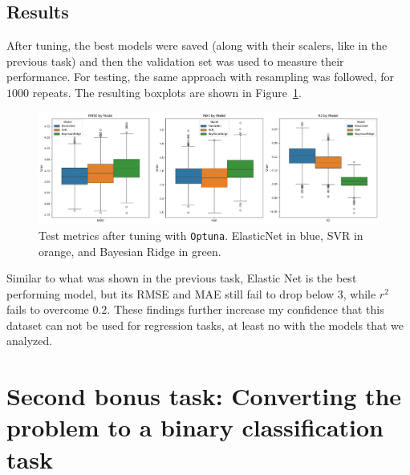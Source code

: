 \documentclass[12pt]{article}
\begin{document}
\subsection{Results}
After tuning, the best models were saved (along with their scalers, like in the
previous task) and then the validation set was used to measure their performance.
For testing, the same approach with resampling was followed, for $1000$ repeats.
The resulting boxplots are shown in Figure~\ref{fig:optuna}.

\begin{figure}[H]
    \centering
    \includegraphics[width=\textwidth]{ims/optuna.png}
    \caption{Test metrics after tuning with \texttt{Optuna}. ElasticNet in blue,
    SVR in orange, and Bayesian Ridge in green.}
    \label{fig:optuna}
\end{figure}

Similar to what was shown in the previous task, Elastic Net is the best performing
model, but its RMSE and MAE still fail to drop below $3$, while $r^2$ fails to
overcome $0.2$. These findings further increase my confidence that this dataset
can not be used for regression tasks, at least no with the models that we analyzed.


\clearpage
\section{Second bonus task: Converting the problem to a binary classification task}
\end{document}
